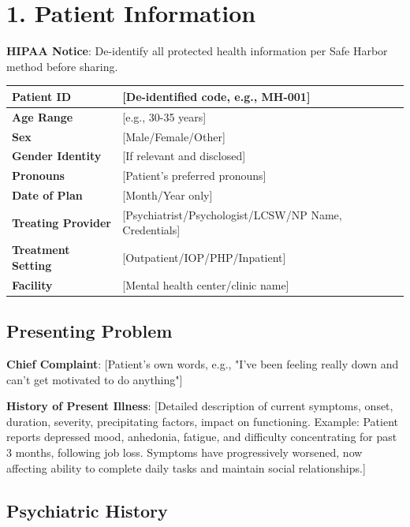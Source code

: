 \documentclass[11pt,letterpaper]{article}
\begin{document}
\section*{1. Patient Information}

\textbf{HIPAA Notice}: De-identify all protected health information per Safe Harbor method before sharing.

\vspace{0.5em}

\begin{tabularx}{\textwidth}{|l|X|}
\hline
\textbf{Patient ID} & [De-identified code, e.g., MH-001] \\ \hline
\textbf{Age Range} & [e.g., 30-35 years] \\ \hline
\textbf{Sex} & [Male/Female/Other] \\ \hline
\textbf{Gender Identity} & [If relevant and disclosed] \\ \hline
\textbf{Pronouns} & [Patient's preferred pronouns] \\ \hline
\textbf{Date of Plan} & [Month/Year only] \\ \hline
\textbf{Treating Provider} & [Psychiatrist/Psychologist/LCSW/NP Name, Credentials] \\ \hline
\textbf{Treatment Setting} & [Outpatient/IOP/PHP/Inpatient] \\ \hline
\textbf{Facility} & [Mental health center/clinic name] \\ \hline
\end{tabularx}

\vspace{1em}

\subsection*{Presenting Problem}

\textbf{Chief Complaint}: [Patient's own words, e.g., "I've been feeling really down and can't get motivated to do anything"]

\textbf{History of Present Illness}:
[Detailed description of current symptoms, onset, duration, severity, precipitating factors, impact on functioning. Example: Patient reports depressed mood, anhedonia, fatigue, and difficulty concentrating for past 3 months, following job loss. Symptoms have progressively worsened, now affecting ability to complete daily tasks and maintain social relationships.]

\subsection*{Psychiatric History}
\end{document}

